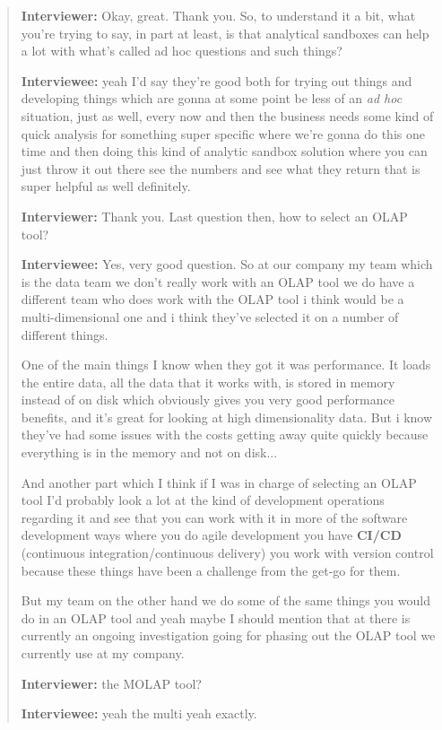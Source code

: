 \begin{quote}
    \textbf{Interviewer:} Okay, great. Thank you. So, to understand it a bit, what you're trying to say, in part at least, is that analytical sandboxes can help a lot with what's called ad hoc questions and such things?

    \textbf{Interviewee:} yeah I'd say they're good both for trying out things and developing things which are gonna at some point be less of an \textit{ad hoc} situation, just as well, every now and then the business needs some kind of quick analysis for something super specific where we're gonna do this one time and then doing this kind of analytic sandbox solution where you can just throw it out there see the numbers and see what they return that is super helpful as well definitely.

    \textbf{Interviewer:} Thank you. Last question then, how to select an OLAP tool?

    \textbf{Interviewee:} Yes, very good question. So at our company my team which is the data team we don't really work with an OLAP tool we do have a different team who does work with the OLAP tool i think would be a multi-dimensional one and i think they've selected it on a number of different things.

    One of the main things I know when they got it was performance. It loads the entire data, all the data that it works with, is stored in memory instead of on disk which obviously gives you very good performance benefits, and it's great for looking at high dimensionality data. 
    But i know they've had some issues with the costs getting away quite quickly because everything is in the memory and not on disk...
    
    And another part which I think if I was in charge of selecting an OLAP tool I'd probably look a lot at the kind of development operations regarding it and see that you can work with it in more of the software development ways where you do agile development you have \textbf{CI/CD} (continuous integration/continuous delivery) you work with version control because these things have been a challenge from the get-go for them.
    
    But my team on the other hand we do some of the same things you would do in an OLAP tool and yeah maybe I should mention that at there is currently an ongoing investigation going for phasing out the OLAP tool we currently use at my company.

    \textbf{Interviewer:} the MOLAP tool?

    \textbf{Interviewee:} yeah the multi yeah exactly.


\end{quote}
